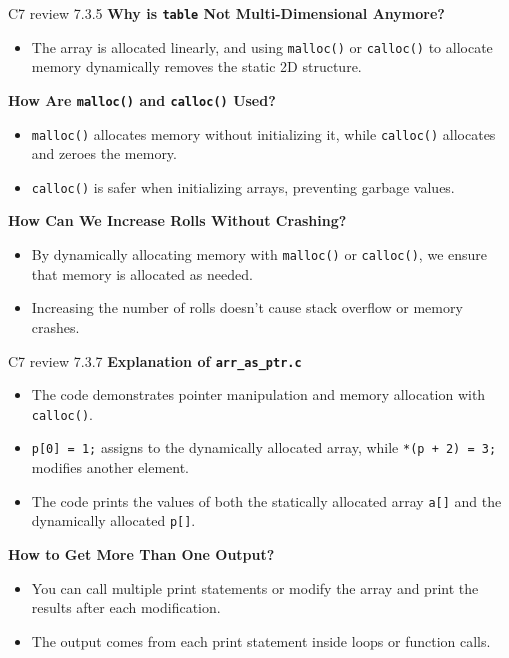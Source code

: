 \documentclass[
	11pt, %
]{beamer}
\begin{document}
\begin{frame}{C7 review 7.3.5}
    \textbf{Why is \texttt{table} Not Multi-Dimensional Anymore?}
    \begin{itemize}
        \item The array is allocated linearly, and using \texttt{malloc()} or \texttt{calloc()} to allocate memory dynamically removes the static 2D structure.
    \end{itemize}
	\textbf{How Are \texttt{malloc()} and \texttt{calloc()} Used?}
    \begin{itemize}
        \item \texttt{malloc()} allocates memory without initializing it, while \texttt{calloc()} allocates and zeroes the memory.
        \item \texttt{calloc()} is safer when initializing arrays, preventing garbage values.
    \end{itemize}
    \textbf{How Can We Increase Rolls Without Crashing?}
    \begin{itemize}
        \item By dynamically allocating memory with \texttt{malloc()} or \texttt{calloc()}, we ensure that memory is allocated as needed.
        \item Increasing the number of rolls doesn't cause stack overflow or memory crashes.
    \end{itemize}
\end{frame}


\begin{frame}{C7 review 7.3.7}
    \textbf{Explanation of \texttt{arr\_as\_ptr.c}}
    \begin{itemize}
        \item The code demonstrates pointer manipulation and memory allocation with \texttt{calloc()}.
        \item \texttt{p[0] = 1;} assigns to the dynamically allocated array, while \texttt{*(p + 2) = 3;} modifies another element.
        \item The code prints the values of both the statically allocated array \texttt{a[]} and the dynamically allocated \texttt{p[]}.
    \end{itemize}
    \textbf{How to Get More Than One Output?}
    \begin{itemize}
        \item You can call multiple print statements or modify the array and print the results after each modification.
        \item The output comes from each print statement inside loops or function calls.
    \end{itemize}
\end{frame}
\end{document}
